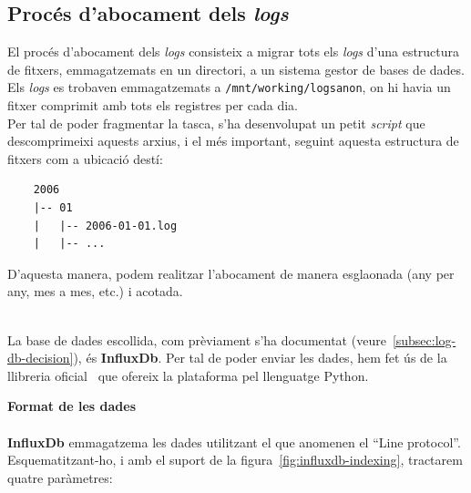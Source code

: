 \clearpage

\subsection{Procés d'abocament dels \textit{\gls{log}s}}\label{subsec:log-push}

\noindent
El procés d’abocament dels \textit{\gls{log}s} consisteix a migrar tots els \textit{\gls{log}s} d’una estructura de fitxers, emmagatzemats en un directori, a un sistema gestor de bases de dades. \\

\noindent
Els \textit{\gls{log}s} es trobaven emmagatzemats a \texttt{/mnt/working/logsanon}, on hi havia un fitxer comprimit amb tots els registres per cada dia. \\

\noindent
Per tal de poder fragmentar la tasca, s’ha desenvolupat un petit \textit{script} que descomprimeixi aquests arxius, i el més important, seguint aquesta estructura de fitxers com a ubicació destí:

\begin{verbatim}
    2006
    |-- 01
    |   |-- 2006-01-01.log
    |   |-- ...
\end{verbatim}
\noindent
D’aquesta manera, podem realitzar l’abocament de manera esglaonada (any per any, mes a mes, etc.) i acotada.

\noindent \\
La base de dades escollida, com prèviament s’ha documentat (veure~\ref{subsec:log-db-decision}), és \textbf{InfluxDb}.
Per tal de poder enviar les dades, hem fet ús de la llibreria oficial~\cite{influxdb:python} que ofereix la plataforma pel llenguatge Python.

\clearpage

\noindent
\textbf{Format de les dades} \\ \\
\textbf{InfluxDb} emmagatzema les dades utilitzant el que anomenen el ``Line protocol''.
Esquematitzant-ho, i amb el suport de la figura~\ref{fig:influxdb-indexing}, tractarem quatre paràmetres:

